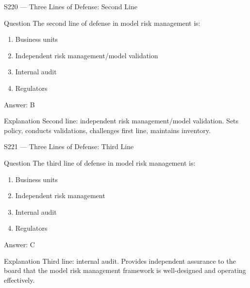 \documentclass[aspectratio=169,8pt]{beamer}
\begin{document}
	\begin{frame}{S220 --- Three Lines of Defense: Second Line}
		\begin{block}{Question}
			The second line of defense in model risk management is:
			\begin{enumerate}
				\item Business units
				\item Independent risk management/model validation
				\item Internal audit
				\item Regulators
			\end{enumerate}
		\end{block}
		\begin{exampleblock}{Answer: B}\end{exampleblock}
		\begin{block}{Explanation}
			Second line: independent risk management/model validation. Sets policy, conducts validations, challenges first line, maintains inventory.
		\end{block}
	\end{frame}
	
	\begin{frame}{S221 --- Three Lines of Defense: Third Line}
		\begin{block}{Question}
			The third line of defense in model risk management is:
			\begin{enumerate}
				\item Business units
				\item Independent risk management
				\item Internal audit
				\item Regulators
			\end{enumerate}
		\end{block}
		\begin{exampleblock}{Answer: C}\end{exampleblock}
		\begin{block}{Explanation}
			Third line: internal audit. Provides independent assurance to the board that the model risk management framework is well-designed and operating effectively.
		\end{block}
	\end{frame}
	
\end{document}
